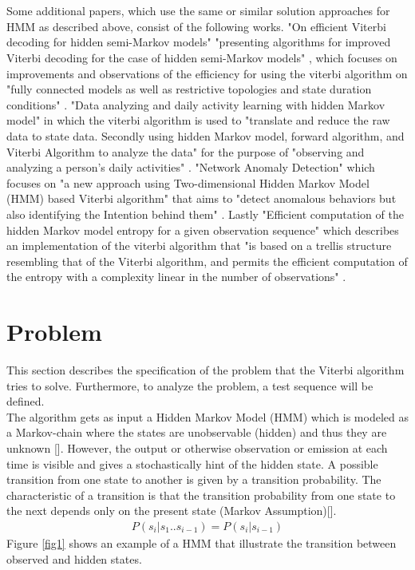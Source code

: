 \documentclass[12pt,journal,compsoc]{IEEEtran}
\begin{document}
\\
\\
Some additional papers, which use the same or similar solution approaches for HMM as described above, consist of the
following works. "On efficient Viterbi decoding for hidden semi-Markov models" \cite{article:viterbiEfficiency}
"presenting algorithms for improved Viterbi decoding for the case of hidden semi-Markov models" \cite{article:viterbiEfficiency}, which focuses
on improvements and observations of the efficiency for using the viterbi algorithm on "fully connected models
as well as restrictive topologies and state duration conditions" \cite{article:viterbiEfficiency}. "Data analyzing and daily activity learning
with hidden Markov model" \cite{article:dataAnalyzing} in which the viterbi algorithm is used to "translate and
reduce the raw data to state data. Secondly using hidden Markov model, forward algorithm, and Viterbi Algorithm
to analyze the data" \cite{article:dataAnalyzing} for the purpose of "observing and analyzing a person's daily activities" \cite{article:dataAnalyzing}. "Network Anomaly
Detection" \cite{article:networkAnomaly} which focuses on "a new approach using Two-dimensional Hidden Markov
Model (HMM) based Viterbi algorithm" \cite{article:networkAnomaly} that aims to "detect anomalous behaviors but also identifying the
Intention behind them" \cite{article:networkAnomaly}. Lastly "Efficient computation of the hidden Markov
model entropy for a given observation sequence" \cite{article:efficientComputation} which describes an implementation of the viterbi algorithm that
"is based on a trellis structure resembling that of the Viterbi algorithm, and permits the efficient computation
of the entropy with a complexity linear in the number of observations" \cite{article:efficientComputation}.

\section{Problem}
This section describes the specification of the problem that the Viterbi algorithm tries to solve. Furthermore, to analyze the problem, a test sequence will be defined. \\
The algorithm gets as input a Hidden Markov Model (HMM) which is modeled as a Markov-chain where the states are unobservable (hidden) and thus they are unknown []. 
However, the output or otherwise observation or emission at each time is visible and gives a stochastically hint of the hidden state. A possible transition from one state to another is given by a transition probability. The characteristic of a transition is that the transition probability from one state to the next depends only on the present state (Markov Assumption)[].
\begin{align}
  P(s_i|s_1..s_{i-1}) = P(s_i|s_{i-1})
\end{align}
Figure \ref{fig1} shows an example of a HMM that illustrate the transition between observed and hidden states. 
\end{document}

